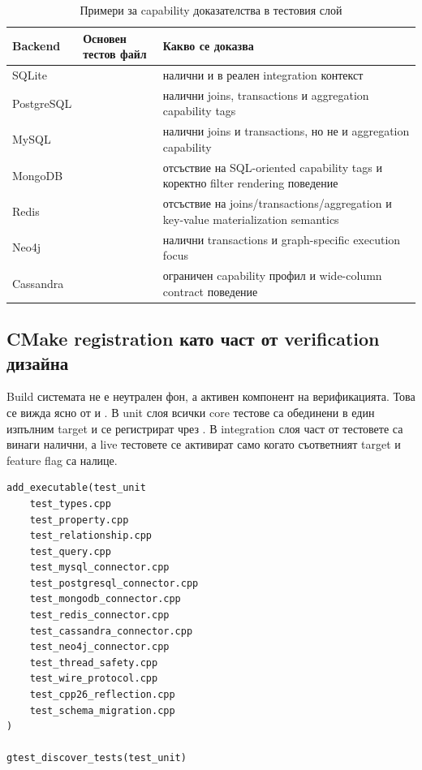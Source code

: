 \begin{table}[H]
\centering
\small
\caption{Примери за capability доказателства в тестовия слой}
\label{tab:appendix_capability_evidence}
\begin{tabularx}{\textwidth}{L{2.6cm}L{2.6cm}Z}
\toprule
\textbf{Backend} & \textbf{Основен тестов файл} & \textbf{Какво се доказва} \\
\midrule
SQLite &  & налични  и  в реален integration контекст \\
PostgreSQL &  & налични joins, transactions и aggregation capability tags \\
MySQL &  & налични joins и transactions, но не и aggregation capability \\
MongoDB &  & отсъствие на SQL-oriented capability tags и коректно filter rendering поведение \\
Redis &  & отсъствие на joins/transactions/aggregation и key-value materialization semantics \\
Neo4j &  & налични transactions и graph-specific execution focus \\
Cassandra &  & ограничен capability профил и wide-column contract поведение \\
\bottomrule
\end{tabularx}
\end{table}

\subsection{CMake registration като част от verification дизайна}

Build системата не е неутрален фон, а активен компонент на верификацията. Това се вижда ясно от  и . В unit слоя всички core тестове са обединени в един изпълним target и се регистрират чрез . В integration слоя част от тестовете са винаги налични, а live тестовете се активират само когато съответният target и feature flag са налице.

\begin{lstlisting}[caption={Извадка от unit test registration-а},label={lst:appendix_unit_cmake}]
add_executable(test_unit
    test_types.cpp
    test_property.cpp
    test_relationship.cpp
    test_query.cpp
    test_mysql_connector.cpp
    test_postgresql_connector.cpp
    test_mongodb_connector.cpp
    test_redis_connector.cpp
    test_cassandra_connector.cpp
    test_neo4j_connector.cpp
    test_thread_safety.cpp
    test_wire_protocol.cpp
    test_cpp26_reflection.cpp
    test_schema_migration.cpp
)

gtest_discover_tests(test_unit)
\end{lstlisting}


